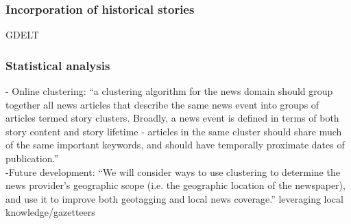 \subsubsection{Incorporation of historical stories}
GDELT

\subsubsection{Statistical analysis}
-{\color{orange} Online clustering: “a clustering algorithm for the news domain should group together all news articles that describe the same news event into groups of articles termed story clusters. Broadly, a news event is defined in terms of both story content and story lifetime - articles in the same cluster should share much of the same important keywords, and should have temporally proximate dates of publication.”\cite{Teitler2008}}\\
-{\color{orange}Future development: “We will consider ways to use clustering to determine the news provider’s geographic scope (i.e. the geographic location of the newspaper), and use it to improve both geotagging and local news coverage.” }{\color{purple}leveraging local knowledge/gazetteers}\cite{Teitler2008}\\

